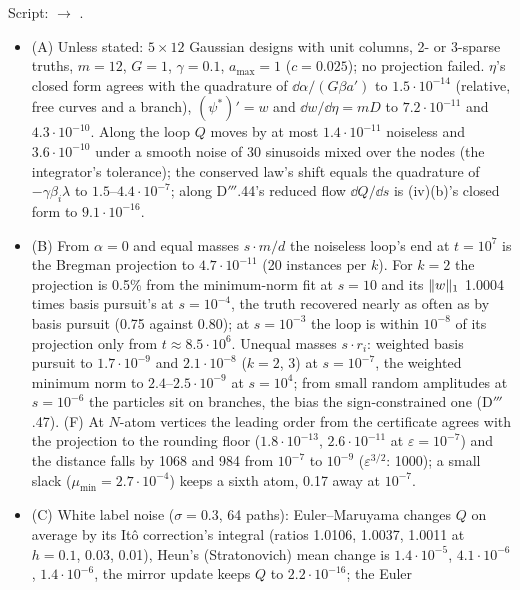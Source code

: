 Script:  $\to$ .
\begin{itemize}
  \item (A) Unless stated: $5\times12$ Gaussian designs with unit columns, 2- or 3-sparse truths, $m = 12$, $G = 1$,
    $\gamma = 0.1$, $a_{\max} = 1$ ($c = 0.025$); no projection failed. $\eta$'s closed form agrees with the quadrature of
    $\dd\alpha/(G\beta a')$ to $1.5\cdot10^{-14}$ (relative, free curves and a branch), $(\psi^*)' = w$ and
    $\dd w/\dd\eta = mD$ to $7.2\cdot10^{-11}$ and $4.3\cdot10^{-10}$. Along the loop $Q$ moves by at most
    $1.4\cdot10^{-11}$ noiseless and $3.6\cdot10^{-10}$ under a smooth noise of 30 sinusoids mixed over the nodes (the
    integrator's tolerance); the conserved law's shift equals the quadrature of $-\gamma\beta_i\lambda$ to
    $1.5$--$4.4\cdot10^{-7}$; along D$'''$.44's reduced flow $\dd Q/\dd s$ is (iv)(b)'s closed form to
    $9.1\cdot10^{-16}$.
  \item (B) From $\alpha = 0$ and equal masses $s\cdot m/d$ the noiseless loop's end at $t = 10^7$ is the Bregman
    projection to $4.7\cdot10^{-11}$ (20 instances per $k$). For $k = 2$ the projection is 0.5\% from the minimum-norm fit
    at $s = 10$ and its $\lVert w\rVert_1$ 1.0004 times basis pursuit's at $s = 10^{-4}$, the truth recovered nearly as often as
    by basis pursuit (0.75 against 0.80); at $s = 10^{-3}$ the loop is within $10^{-8}$ of its projection only from
    $t\approx8.5\cdot10^6$. Unequal masses $s\cdot r_i$: weighted basis pursuit to $1.7\cdot10^{-9}$ and
    $2.1\cdot10^{-8}$ ($k = 2$, 3) at $s = 10^{-7}$, the weighted minimum norm to $2.4$--$2.5\cdot10^{-9}$ at $s = 10^4$;
    from small random amplitudes at $s = 10^{-6}$ the particles sit on branches, the bias the sign-constrained one
    (D$'''$.47). (F) At $N$-atom vertices the leading order from the certificate agrees with the projection to the
    rounding floor ($1.8\cdot10^{-13}$, $2.6\cdot10^{-11}$ at $\varepsilon = 10^{-7}$) and the distance falls by 1068 and
    984 from $10^{-7}$ to $10^{-9}$ ($\varepsilon^{3/2}$: 1000); a small slack ($\mu_{\min} = 2.7\cdot10^{-4}$) keeps a
    sixth atom, 0.17 away at $10^{-7}$.
  \item (C) White label noise ($\sigma = 0.3$, 64 paths): Euler--Maruyama changes $Q$ on average by its It\^o
    correction's integral (ratios 1.0106, 1.0037, 1.0011 at $h = 0.1$, 0.03, 0.01), Heun's (Stratonovich) mean change is
    $1.4\cdot10^{-5}$, $4.1\cdot10^{-6}$, $1.4\cdot10^{-6}$, the mirror update keeps $Q$ to $2.2\cdot10^{-16}$; the Euler

\end{itemize}
